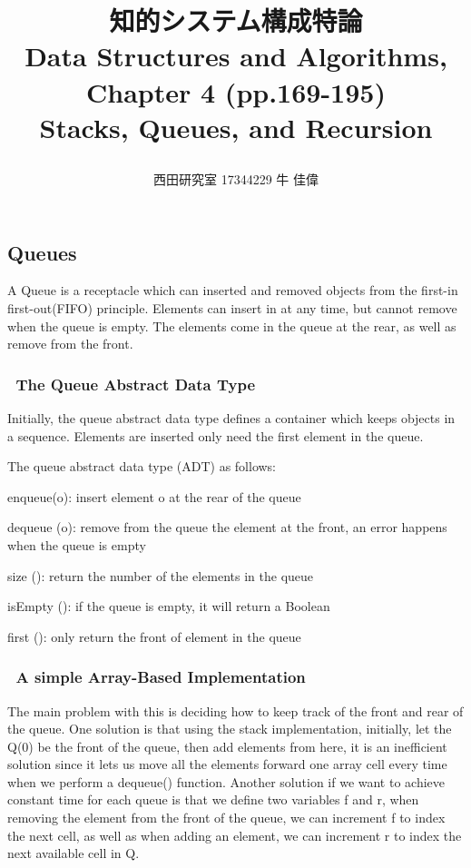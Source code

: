 \documentclass[twocolumn,10pt]{jarticle}
\title{\vspace{-20truemm}
{\normalsize \rightline{平成29年\ 5月\ 25日}}  %
{\large 知的システム構成特論\\} %
{\large Data Structures and Algorithms, %
Chapter 4 (pp.169-195)\\} %
Stacks, Queues, and Recursion %
\date{}
\vspace{-2truemm}}
\author{西田研究室 17344229 牛 佳偉} %
\begin{document}
\twocolumn[\maketitle]

\setcounter{section}{4}
\setcounter{subsection}{2}
\subsection{Queues}


A Queue is a receptacle which can inserted and removed objects from the first-in first-out(FIFO) principle. Elements can insert in at any time, but cannot remove when the queue is empty. The elements come in the queue at the rear, as well as remove from the front.
\subsubsection{\ The Queue Abstract Data Type}
Initially, the queue abstract data type defines a container which keeps objects in a sequence. Elements are inserted only need the first element in the queue.

The queue abstract data type (ADT) as follows:

enqueue(o): insert element o at the rear of the queue

dequeue (o): remove from the queue the element at the front, an error happens when the queue is empty

size (): return the number of the elements in the queue

isEmpty (): if the queue is empty, it will return a Boolean

first (): only return the front of element in the queue
\subsubsection{\ A simple Array-Based Implementation}
The main problem with this is deciding how to keep track of the front and rear of the queue. One solution is that using the stack implementation, initially, let the Q(0) be the front of the queue, then add elements from here, it is an inefficient solution since it lets us move all the elements forward one array cell every time when we perform a dequeue() function. Another solution if we want to achieve constant time for each queue is that we define two variables f and r, when removing the element from the front of the queue, we can increment f to index the next cell, as well as when adding an element, we can increment r to index the next available cell in Q.
\end{document}
